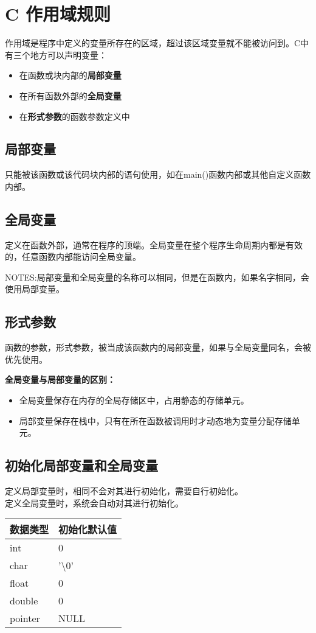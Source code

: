 \documentclass[UTF8]{ctexart}
\begin{document}
	\clearpage
	\section{C 作用域规则}
	作用域是程序中定义的变量所存在的区域，超过该区域变量就不能被访问到。C中有三个地方可以声明变量：\begin{itemize}
		\item 在函数或块内部的\textbf{局部变量}
		\item 在所有函数外部的\textbf{全局变量}
		\item 在\textbf{形式参数}的函数参数定义中
	\end{itemize}
	\subsection{局部变量}
	只能被该函数或该代码块内部的语句使用，如在main()函数内部或其他自定义函数内部。
	\subsection{全局变量}
	定义在函数外部，通常在程序的顶端。全局变量在整个程序生命周期内都是有效的，任意函数内部能访问全局变量。
	\begin{framed}
		NOTES:局部变量和全局变量的名称可以相同，但是在函数内，如果名字相同，会使用局部变量。
	\end{framed}
	\subsection{形式参数}
	函数的参数，形式参数，被当成该函数内的局部变量，如果与全局变量同名，会被优先使用。
	\begin{framed}
		\textbf{全局变量与局部变量的区别：}
		\begin{itemize}
			\item 全局变量保存在内存的全局存储区中，占用静态的存储单元。
			\item 局部变量保存在栈中，只有在所在函数被调用时才动态地为变量分配存储单元。
		\end{itemize}
	\end{framed}
	\subsection{初始化局部变量和全局变量}
	定义局部变量时，相同不会对其进行初始化，需要自行初始化。\\定义全局变量时，系统会自动对其进行初始化。\begin{center}
	\begin{tabular*}{0.4\linewidth}{l|l}
		\toprule
		数据类型 & 初始化默认值\\
		\midrule
		int & 0 \\
		char & '\textbackslash 0'\\
		float & 0 \\
		double & 0 \\
		pointer & NULL \\
		\bottomrule
	\end{tabular*}
	\end{center}
\end{document}
